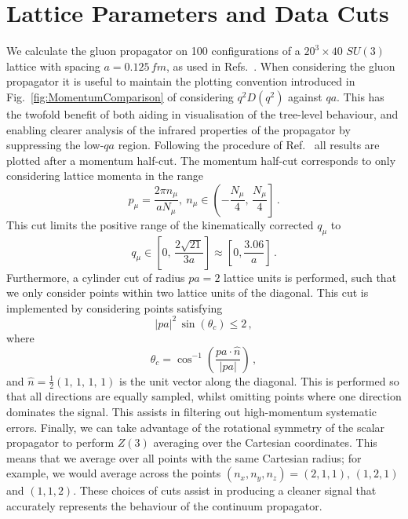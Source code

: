 \section{Lattice Parameters and Data Cuts} \label{sec:LatticeParameters}
We calculate the gluon propagator on 100 configurations of a $20^3\times 40$ $SU(3)$ lattice with spacing $a=0.125\,\si{fm}$, as used in Refs.~\cite{Trewartha:2015nna,OMalley:2011aa}. When considering the gluon propagator it is useful to maintain the plotting convention introduced in Fig.~\ref{fig:MomentumComparison} of considering $q^2D(q^2)$ against $qa$. This has the twofold benefit of both aiding in visualisation of the tree-level behaviour, and enabling clearer analysis of the infrared properties of the propagator by suppressing the low-$qa$ region. Following the procedure of Ref.~\cite{Bonnet:2001uh,Leinweber:1998im} all results are plotted after a momentum half-cut. The momentum half-cut corresponds to only considering lattice momenta in the range
%
\begin{equation}
p_\mu = \frac{2\pi n_\mu}{a N_\mu},~n_\mu\in \left(-\frac{N_\mu}{4},\,\frac{N_\mu}{4}\right]\, .
\end{equation}
%
This cut limits the positive range of the kinematically corrected $q_\mu$ to
%
\begin{equation}
q_\mu \in \left[0,\, \frac{2\sqrt{21}}{3a}\right]\approx\left[0,\frac{3.06}{a} \right]\, .
\end{equation}
%
Furthermore, a cylinder cut of radius $pa=2$ lattice units is performed, such that we only consider points within two lattice units of the diagonal. This cut is implemented by considering points satisfying
%
\begin{equation}
|pa|^2\, \sin(\theta_c) \leq 2\, ,
\end{equation}
%
where
%
\begin{equation}
\theta_c = \cos^{-1}\left(\frac{pa \cdot \hat{n}}{|pa|}\right)\, ,
\end{equation}
%
and $\hat{n} = \frac{1}{2}(1,\,1,\,1,\,1)$ is the unit vector along the diagonal. This is performed so that all directions are equally sampled, whilst omitting points where one direction dominates the signal. This assists in filtering out high-momentum systematic errors. Finally, we can take advantage of the rotational symmetry of the scalar propagator to perform $Z(3)$ averaging over the Cartesian coordinates. This means that we average over all points with the same Cartesian radius; for example, we would average across the points $(n_x,n_y,n_z)=(2,1,1),\,(1,2,1)$ and $(1,1,2)$. These choices of cuts assist in producing a cleaner signal that accurately represents the behaviour of the continuum propagator.\\

